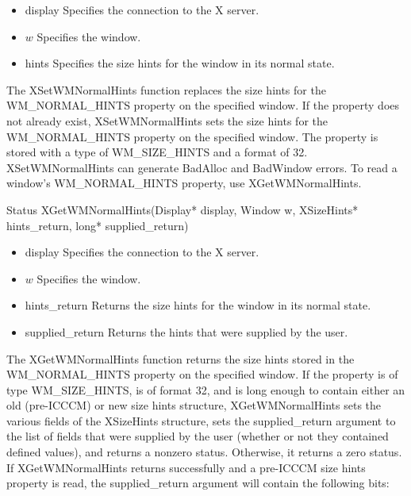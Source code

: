 \documentclass{report}
\begin{document}
\begin{itemize}
\begin{itemize}
\begin{cppcode}
            \end{cppcode}
            \begin{itemize}
                \item display Specifies the connection to the X server.
                \item $w$ Specifies the window.
                \item hints Specifies the size hints for the window in its normal state.
            \end{itemize}
            The XSetWMNormalHints function replaces the size hints for the WM\_NORMAL\_HINTS property on the specified window. If the property does not already exist, XSetWMNormalHints sets the size hints for the WM\_NORMAL\_HINTS property on the specified window. The property is stored with a type of WM\_SIZE\_HINTS and a format of 32.
            \bigbreak \noindent 
            XSetWMNormalHints can generate BadAlloc and BadWindow errors.
            \bigbreak \noindent 
            To read a window’s WM\_NORMAL\_HINTS property, use XGetWMNormalHints.
            \bigbreak \noindent 
            \begin{cppcode}
            Status XGetWMNormalHints(Display* display, Window w, XSizeHints* hints_return, long* supplied_return)
            \end{cppcode}
            \begin{itemize}
                \item display Specifies the connection to the X server.
                \item $w$ Specifies the window.
                \item hints\_return Returns the size hints for the window in its normal state.
                \item supplied\_return Returns the hints that were supplied by the user.
            \end{itemize}
            The XGetWMNormalHints function returns the size hints stored in the WM\_NORMAL\_HINTS property on the specified window. If the property is of type WM\_SIZE\_HINTS, is of format 32, and is long enough to contain either an old (pre-ICCCM) or new size hints structure, XGetWMNormalHints sets the various fields of the XSizeHints structure, sets the supplied\_return argument to the list of fields that were supplied by the user (whether or not they contained defined values), and returns a nonzero status. Otherwise, it returns a zero status.
            \bigbreak \noindent 
            If XGetWMNormalHints returns successfully and a pre-ICCCM size hints property is read, the supplied\_return argument will contain the following bits:

\end{itemize}
\end{itemize}
\end{document}
